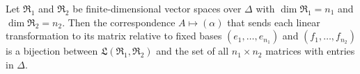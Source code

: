 Let $\mathfrak{R}_1$ and $\mathfrak{R}_2$ be finite-dimensional vector spaces over $\Delta$ with $\dim \mathfrak{R}_1 = n_1$ and $\dim \mathfrak{R}_2 = n_2$. Then the correspondence $A \mapsto (\alpha)$ that sends each linear transformation to its matrix relative to fixed bases $(e_1, \dots, e_{n_1})$ and $(f_1, \dots, f_{n_2})$ is a bijection between $\mathfrak{L}(\mathfrak{R}_1, \mathfrak{R}_2)$ and the set of all $n_1 \times n_2$ matrices with entries in $\Delta$.
